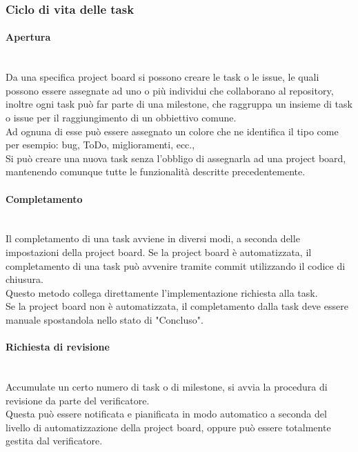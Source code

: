 \subsubsection{Ciclo di vita delle task}

\paragraph{Apertura} \-\\
	Da una specifica project board si possono creare le task o le issue\glossario, le quali possono essere assegnate ad uno o più individui che collaborano al repository, inoltre ogni task può far parte di una milestone, che raggruppa un insieme di task o issue per il raggiungimento di un obbiettivo comune. \\
	Ad ognuna di esse può essere assegnato un colore che ne identifica il tipo come per esempio: bug, ToDo, miglioramenti, ecc.,\\
	Si può creare una nuova task senza l'obbligo di assegnarla ad una project board, mantenendo comunque tutte le funzionalità descritte precedentemente. 

\paragraph{Completamento} \-\\\label{ProcessiOrganizzativi_GestioneProgetto_CicloTask_Completamento}
	Il completamento di una task avviene in diversi modi, a seconda delle impostazioni della project board. 
	Se la project board è automatizzata, il completamento di una task può avvenire tramite commit utilizzando il codice di chiusura. \\
	Questo metodo collega direttamente l'implementazione richiesta alla task. \\
	Se la project board non è automatizzata, il completamento dalla task deve essere manuale spostandola nello stato di "Concluso". 
	
\paragraph{Richiesta di revisione} \-\\
	Accumulate un certo numero di task o di milestone, si avvia la procedura di revisione da parte del verificatore. \\ Questa può essere notificata e pianificata in modo automatico a seconda del livello di automatizzazione della project board, oppure può essere totalmente gestita dal verificatore. 
	
